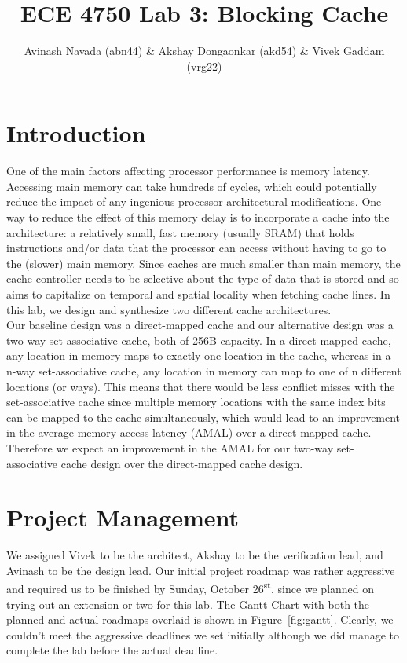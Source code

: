 \documentclass[10pt]{article}
\begin{document}
\title{ECE 4750 Lab 3: Blocking Cache}
\author{Avinash Navada (abn44) \& Akshay Dongaonkar (akd54) \& Vivek Gaddam (vrg22)}
\maketitle


\section{Introduction}

One of the main factors affecting processor performance is memory latency. Accessing main memory can take hundreds of cycles, which could potentially reduce the impact of any ingenious processor architectural modifications. One way to reduce the effect of this memory delay is to incorporate a cache into the architecture: a relatively small, fast memory (usually SRAM) that holds instructions and/or data that the processor can access without having to go to the (slower) main memory. Since caches are much smaller than main memory, the cache controller needs to be selective about the type of data that is stored and so aims to capitalize on temporal and spatial locality when fetching cache lines. In this lab, we design and synthesize two different cache architectures.  \\

Our baseline design was a direct-mapped cache and our alternative design was a two-way set-associative cache, both of 256B capacity. In a direct-mapped cache, any location in memory maps to exactly one location in the cache, whereas in a n-way set-associative cache, any location in memory can map to one of n different locations (or ways). This means that there would be less conflict misses with the set-associative cache since multiple memory locations with the same index bits can be mapped to the cache simultaneously, which would lead to an improvement in the average memory access latency (AMAL) over a direct-mapped cache. Therefore we expect an improvement in the AMAL for our two-way set-associative cache design over the direct-mapped cache design.


\section{Project Management}

We assigned Vivek to be the architect, Akshay to be the verification lead, and Avinash to be the design lead.
Our initial project roadmap was rather aggressive and required us to be finished by Sunday, October 26\textsuperscript{st}, since we planned on trying out an extension or two for this lab. The Gantt Chart with both the planned and actual roadmaps overlaid is shown in Figure~\ref{fig:gantt}. Clearly, we couldn't meet the aggressive deadlines we set initially although we did manage to complete the lab before the actual deadline. \\
\end{document}
